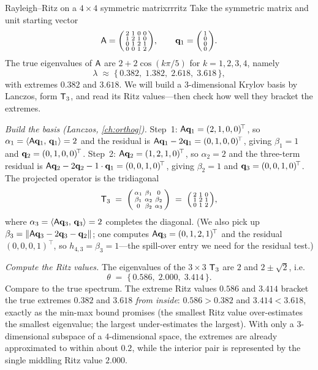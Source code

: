 \begin{workedexample}{Rayleigh--Ritz on a $4\times4$ symmetric matrix}{rrritz}
Take the symmetric matrix and unit starting vector
\[
  \mathsf{A} = \begin{psmallmatrix}
    2 & 1 & 0 & 0\\ 1 & 2 & 1 & 0\\ 0 & 1 & 2 & 1\\ 0 & 0 & 1 & 2
  \end{psmallmatrix},
  \qquad
  \mathbf{q}_1 = \begin{psmallmatrix} 1\\0\\0\\0 \end{psmallmatrix}.
\]
The true eigenvalues of $\mathsf{A}$ are $2 + 2\cos(k\pi/5)$ for $k=1,2,3,4$, namely
\[
  \lambda \;\approx\; \{\,0.382,\; 1.382,\; 2.618,\; 3.618\,\},
\]
with extremes $0.382$ and $3.618$. We will build a $3$-dimensional Krylov basis by
Lanczos, form $\mathsf{T}_3$, and read its Ritz values---then check how well they bracket the
extremes.

\smallskip
\emph{Build the basis (Lanczos, \cref{ch:orthog}).} Step~1:
$\mathsf{A}\mathbf{q}_1 = (2,1,0,0)^{\!\top}$, so $\alpha_1 = \left\langle \mathsf{A}\mathbf{q}_1,\, \mathbf{q}_1\right\rangle = 2$ and the
residual is $\mathsf{A}\mathbf{q}_1 - 2\mathbf{q}_1 = (0,1,0,0)^{\!\top}$, giving $\beta_1 = 1$ and
$\mathbf{q}_2 = (0,1,0,0)^{\!\top}$. Step~2: $\mathsf{A}\mathbf{q}_2 = (1,2,1,0)^{\!\top}$, so $\alpha_2 = 2$
and the three-term residual is $\mathsf{A}\mathbf{q}_2 - 2\mathbf{q}_2 - 1\cdot\mathbf{q}_1 = (0,0,1,0)^{\!\top}$,
giving $\beta_2 = 1$ and $\mathbf{q}_3 = (0,0,1,0)^{\!\top}$. The projected operator is the
tridiagonal
\[
  \mathsf{T}_3 \;=\; \begin{psmallmatrix}
    \alpha_1 & \beta_1 & 0\\ \beta_1 & \alpha_2 & \beta_2\\ 0 & \beta_2 & \alpha_3
  \end{psmallmatrix}
  \;=\; \begin{psmallmatrix} 2 & 1 & 0\\ 1 & 2 & 1\\ 0 & 1 & 2 \end{psmallmatrix},
\]
where $\alpha_3 = \left\langle \mathsf{A}\mathbf{q}_3,\, \mathbf{q}_3\right\rangle = 2$ completes the diagonal. (We also pick up
$\beta_3 = \lVert\mathsf{A}\mathbf{q}_3 - 2\mathbf{q}_3 - \mathbf{q}_2\rVert$; one computes $\mathsf{A}\mathbf{q}_3 = (0,1,2,1)^{\!\top}$
and the residual $(0,0,0,1)^{\!\top}$, so $h_{4,3} = \beta_3 = 1$---the spill-over entry we
need for the residual test.)

\smallskip
\emph{Compute the Ritz values.} The eigenvalues of the $3\times3$ $\mathsf{T}_3$ are
$2$ and $2 \pm \sqrt2$, i.e.
\[
  \theta \;=\; \{\,0.586,\; 2.000,\; 3.414\,\}.
\]
Compare to the true spectrum. The extreme Ritz values $0.586$ and $3.414$ bracket the
true extremes $0.382$ and $3.618$ \emph{from inside}: $0.586 > 0.382$ and $3.414 < 3.618$,
exactly as the min-max bound promises (the smallest Ritz value over-estimates the smallest
eigenvalue; the largest under-estimates the largest). With only a $3$-dimensional subspace
of a $4$-dimensional space, the extremes are already approximated to within about $0.2$,
while the interior pair is represented by the single middling Ritz value $2.000$.


\end{workedexample}
